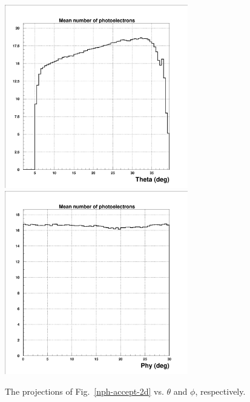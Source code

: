\begin{figure}[htbp]
\centering
\includegraphics[height=8cm,angle=0]{MC-simulation/nph-vs-theta.eps}
\includegraphics[height=8cm,angle=0]{MC-simulation/nph-vs-phi.eps}
\caption{\small{The projections of Fig.~\ref{nph-accept-2d} vs. 
$\theta$ and $\phi$, respectively.}}
\label{nph-vs-theta-phi}
\end{figure}

